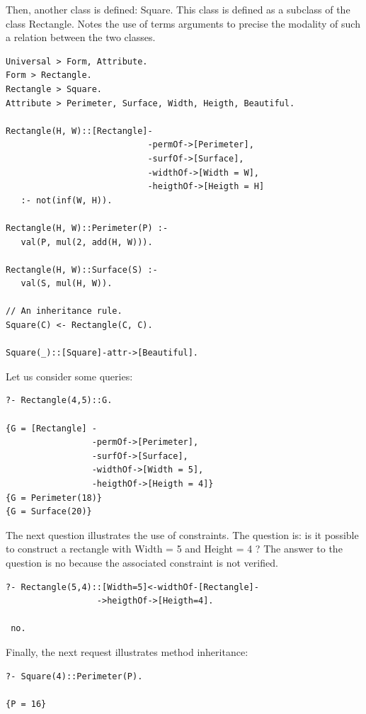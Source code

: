 \documentclass{book}
\begin{document}
Then, another class is defined: Square.  This class is defined as a
subclass of the class Rectangle. Notes the use of terms arguments to
precise the modality of such a relation between the two classes.


\begin{verbatim}
Universal > Form, Attribute.
Form > Rectangle.
Rectangle > Square.
Attribute > Perimeter, Surface, Width, Heigth, Beautiful.
 
Rectangle(H, W)::[Rectangle]-
                            -permOf->[Perimeter],
                            -surfOf->[Surface],
                            -widthOf->[Width = W],
                            -heigthOf->[Heigth = H] 
   :- not(inf(W, H)).

Rectangle(H, W)::Perimeter(P) :- 
   val(P, mul(2, add(H, W))).

Rectangle(H, W)::Surface(S) :-
   val(S, mul(H, W)).

// An inheritance rule.
Square(C) <- Rectangle(C, C).

Square(_)::[Square]-attr->[Beautiful].
\end{verbatim}



Let us consider some queries:


\begin{verbatim}
?- Rectangle(4,5)::G.
 
{G = [Rectangle] -
                 -permOf->[Perimeter],
                 -surfOf->[Surface],
                 -widthOf->[Width = 5],
                 -heigthOf->[Heigth = 4]}
{G = Perimeter(18)}
{G = Surface(20)}
\end{verbatim}


The next question illustrates the use of constraints. The question is:
is it possible to construct a rectangle with Width = 5 and Height = 4
? The answer to the question is no because the associated constraint
is not verified.


\begin{verbatim}
?- Rectangle(5,4)::[Width=5]<-widthOf-[Rectangle]-
                  ->heigthOf->[Heigth=4].
 
 no.
\end{verbatim}



Finally, the next request illustrates method inheritance:


\begin{verbatim}
?- Square(4)::Perimeter(P).
 
{P = 16}
\end{verbatim}
\end{document}

